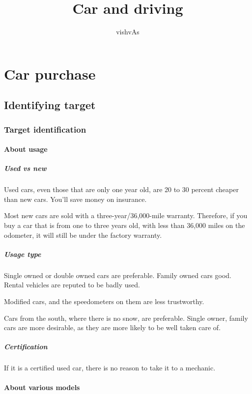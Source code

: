 \documentclass[oneside, article]{memoir}
\title{Car and driving}
\author{vishvAs}
\begin{document}
\maketitle

\part{Car purchase}
\chapter{Identifying target}
\section{Target identification}
\subsection{About usage}
\subsubsection{Used vs new}
Used cars, even those that are only one year old, are 20 to 30 percent cheaper than new cars. You'll save money on insurance.

Most new cars are sold with a three-year/36,000-mile warranty. Therefore, if you buy a car that is from one to three years old, with less than 36,000 miles on the odometer, it will still be under the factory warranty.

\subsubsection{Usage type}
Single owned or double owned cars are preferable. Family owned cars good. Rental vehicles are reputed to be badly used.

Modified cars, and the speedometers on them are less trustworthy.

Cars from the south, where there is no snow, are preferable. Single owner, family cars are more desirable, as they are more likely to be well taken care of.

\subsubsection{Certification}
If it is a certified used car, there is no reason to take it to a mechanic.

\subsection{About various models}
\end{document}

